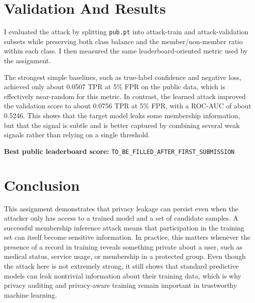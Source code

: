 \documentclass{article} %
\begin{document}
\section{Validation And Results}

I evaluated the attack by splitting \texttt{pub.pt} into attack-train and attack-validation subsets while preserving both class balance and the member/non-member ratio within each class. I then measured the same leaderboard-oriented metric used by the assignment.

The strongest simple baselines, such as true-label confidence and negative loss, achieved only about 0.0507 TPR at 5\% FPR on the public data, which is effectively near-random for this metric. In contrast, the learned attack improved the validation score to about 0.0756 TPR at 5\% FPR, with a ROC-AUC of about 0.5246. This shows that the target model leaks some membership information, but that the signal is subtle and is better captured by combining several weak signals rather than relying on a single threshold.

\noindent\textbf{Best public leaderboard score:} \texttt{TO\_BE\_FILLED\_AFTER\_FIRST\_SUBMISSION}

\section{Conclusion}

This assignment demonstrates that privacy leakage can persist even when the attacker only has access to a trained model and a set of candidate samples. A successful membership inference attack means that participation in the training set can itself become sensitive information. In practice, this matters whenever the presence of a record in training reveals something private about a user, such as medical status, service usage, or membership in a protected group. Even though the attack here is not extremely strong, it still shows that standard predictive models can leak nontrivial information about their training data, which is why privacy auditing and privacy-aware training remain important in trustworthy machine learning.



\end{document}

